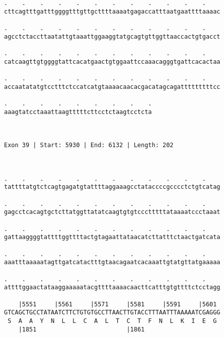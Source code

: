 \documentclass{article}
\begin{document}
\begin{Verbatim}
.    .    .    .    .    .    .    .    .    .    .    .    
cttcagtttgatttggggtttgttgcttttaaaatgagaccatttaatgaattttaaaac
                                                            
.    .    .    .    .    .    .    .    .    .    .    .    
agcctctaccttaatattgtaaattggaaggtatgcagtgttggttaaccactgtgacct
                                                            
.    .    .    .    .    .    .    .    .    .    .    .    
catcaagttgtggggtattcacatgaactgtggaattccaaacagggtgattcacactaa
                                                            
.    .    .    .    .    .    .    .    .    .    .    .    
accaatatatgtcctttctccatcatgtaaaacaacacgacatagcagatttttttttcc
                                                            
.    .    .    .    .    .    .    .    .
aaagtatcctaaattaagtttttcttcctctaagtcctcta
                                         
                                         
 
Exon 39 | Start: 5930 | End: 6132 | Length: 202



.    .    .    .    .    .    .    .    .    .    .    .    
tattttatgtctcagtgagatgtattttaggaaagcctataccccgcccctctgtcatag
                                                            
.    .    .    .    .    .    .    .    .    .    .    .    
gagcctcacagtgctcttatggttatatcaagtgtgtccctttttataaaatccctaaat
                                                            
.    .    .    .    .    .    .    .    .    .    .    .    
gattaaggggtattttggttttactgtagaattataacatcttatttctaactgatcata
                                                            
.    .    .    .    .    .    .    .    .    .    .    .    
aaatttaaaaatagttgatcatactttgtaacagaatcacaaattgtatgttatgaaaaa
                                                            
.    .    .    .    .    .    .    .    .    .    .    .    
attttggaactataaggaaaaatacgttttaaaacaacttcatttgtgttttctcctagg
                                                            
    |5551     |5561     |5571     |5581     |5591     |5601 
GTCAGCTGCCTATAATCTTCTGTGTGCCTTAACTTGTACCTTTAATTTAAAAATCGAGGG
 S  A  A  Y  N  L  L  C  A  L  T  C  T  F  N  L  K  I  E  G 
    |1851                         |1861                     
  

\end{Verbatim}
\end{document}

